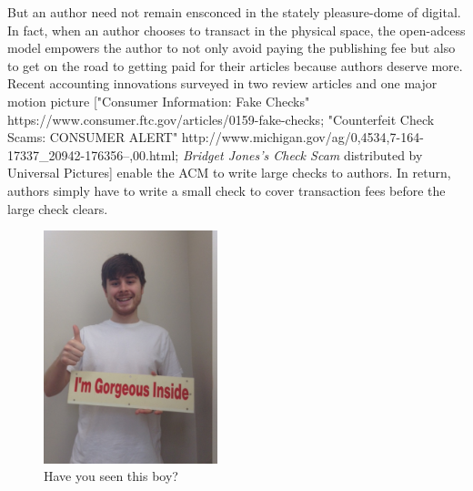 But an author need not remain ensconced in the stately pleasure-dome of digital. In fact, when an author chooses to transact in the physical space, the open-adcess model empowers the author to not only avoid paying the publishing fee but also to get on the road to getting paid for their articles because authors deserve more. Recent accounting innovations surveyed in two review articles and one major motion picture ["Consumer Information: Fake Checks"
https://www.consumer.ftc.gov/articles/0159-fake-checks; "Counterfeit Check Scams: CONSUMER ALERT" http://www.michigan.gov/ag/0,4534,7-164-17337_20942-176356--,00.html; \textit{Bridget Jones's Check Scam} distributed by Universal Pictures] enable the ACM to write large checks to authors. In return, authors simply have to write a small check to cover transaction fees before the large check clears.

\begin{figure}
\centering
\includegraphics[width=0.45\textwidth]{figures/ad.jpg}
\caption{Have you seen this boy?}
\end{figure}
